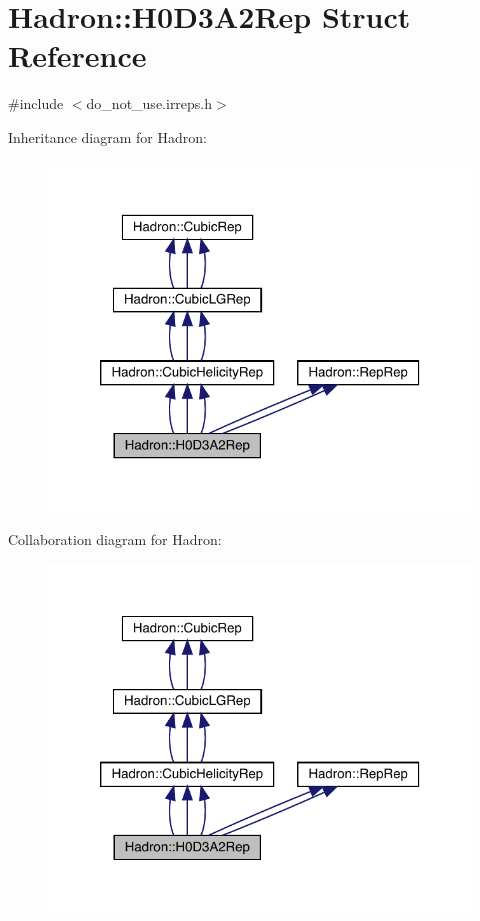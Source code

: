 \hypertarget{structHadron_1_1H0D3A2Rep}{}\section{Hadron\+:\+:H0\+D3\+A2\+Rep Struct Reference}
\label{structHadron_1_1H0D3A2Rep}


{\ttfamily \#include $<$do\+\_\+not\+\_\+use.\+irreps.\+h$>$}



Inheritance diagram for Hadron\+:
\nopagebreak
\begin{figure}[H]
\begin{center}
\leavevmode
\includegraphics[width=320pt]{de/de3/structHadron_1_1H0D3A2Rep__inherit__graph}
\end{center}
\end{figure}


Collaboration diagram for Hadron\+:
\nopagebreak
\begin{figure}[H]
\begin{center}
\leavevmode
\includegraphics[width=320pt]{d4/d39/structHadron_1_1H0D3A2Rep__coll__graph}
\end{center}
\end{figure}
